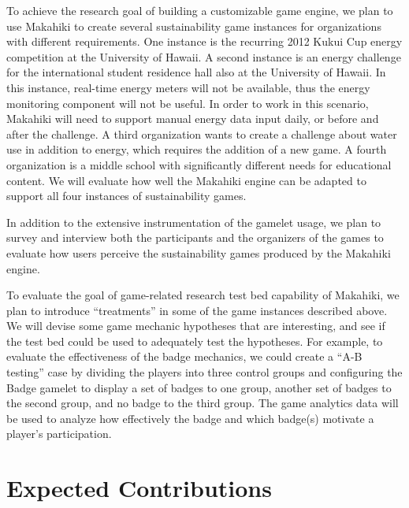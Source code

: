 \documentclass{acm_proc_article-sp}
\begin{document}
To achieve the research goal of building a customizable game engine, we plan to use Makahiki to create several sustainability game instances for organizations with different requirements. One instance is the recurring 2012 Kukui Cup energy competition at the University of Hawaii. A second instance is an energy challenge for the international student residence hall also at the  University of Hawaii. In this instance, real-time energy meters will not be available, thus the energy monitoring component will not be useful. In order to work in this scenario, Makahiki will need to support manual energy data input daily, or before and after the challenge. A third organization wants to create a challenge about water use in addition to energy, which requires the addition of a new game. A fourth organization is a middle school with significantly different needs for educational content. We will evaluate how well the Makahiki engine can be adapted to support all four instances of sustainability games.

In addition to the extensive instrumentation of the gamelet usage, we plan to survey and interview both the participants and the organizers of the games to evaluate how users perceive the sustainability games produced by the Makahiki engine.

To evaluate the goal of game-related research test bed capability of Makahiki, we plan to introduce ``treatments'' in some of the game instances described above. We will devise some game mechanic hypotheses that are interesting, and see if the test bed could be used to adequately test the hypotheses. For example, to evaluate the effectiveness of the badge mechanics, we could create a ``A-B testing'' case by dividing the players into three control groups and configuring the Badge gamelet to display a set of badges to one group, another set of badges to the second group, and no badge to the third group. The game analytics data will be used to analyze how effectively the badge and which badge(s) motivate a player's participation.

\section{Expected Contributions}

\end{document}
